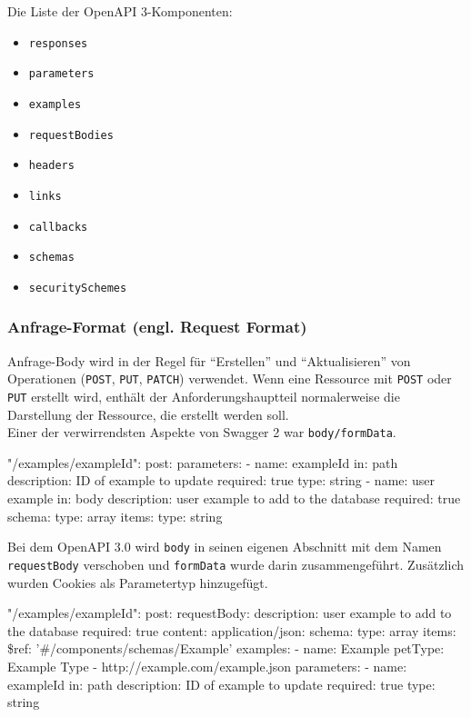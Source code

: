 Die Liste der OpenAPI 3-Komponenten:

\begin{itemize}
	\item \texttt{responses}
	\item \texttt{parameters}
	\item \texttt{examples}
	\item \texttt{requestBodies}
	\item \texttt{headers}
	\item \texttt{links}
	\item \texttt{callbacks}
	\item \texttt{schemas}
	\item \texttt{securitySchemes}\\	
\end{itemize}

\subsubsection{Anfrage-Format (engl. Request Format)}

Anfrage-Body wird in der Regel für "`Erstellen"' und "`Aktualisieren"' von Operationen (\texttt{POST}, \texttt{PUT}, \texttt{PATCH}) verwendet. Wenn eine Ressource mit \texttt{POST} oder \texttt{PUT} erstellt wird, enthält der Anforderungshauptteil normalerweise die Darstellung der Ressource, die erstellt werden soll\cite{openapirequestbody17}.\\

Einer der verwirrendsten Aspekte von Swagger 2 war \texttt{body/formData}.

\begin{LaTeXCode}[caption={Swagger 2.0 - Anfrage-Format},captionpos=b, label=LaTeXCode:openapi3.0-4][numbers=none]
"/examples/{exampleId}":
post:
parameters:
- name: exampleId
in: path
description: ID of example to update
required: true
type: string
- name: user example
in: body
description: user example to add to the database
required: true
schema:
type: array
items:
type: string
\end{LaTeXCode}

Bei dem OpenAPI 3.0 wird \texttt{body} in seinen eigenen Abschnitt mit dem Namen \texttt{requestBody} verschoben und \texttt{formData} wurde darin zusammengeführt. Zusätzlich wurden Cookies als Parametertyp hinzugefügt.

\begin{LaTeXCode}[caption={Open API 3.0 - Anfrage-Format},captionpos=b, label=LaTeXCode:openapi3.0-5][numbers=none]
"/examples/{exampleId}":
post:
	requestBody:
		description: user example to add to the database
		required: true
		content:
			application/json: 
			 schema:
			  type: array
			  items:
			   \$ref: '#/components/schemas/Example'
			examples:
			 - name: Example
			   petType: Example Type
			 - http://example.com/example.json
	parameters:
	 - name: exampleId
	 in: path
	 description: ID of example to update
	 required: true
	 type: string
\end{LaTeXCode}


